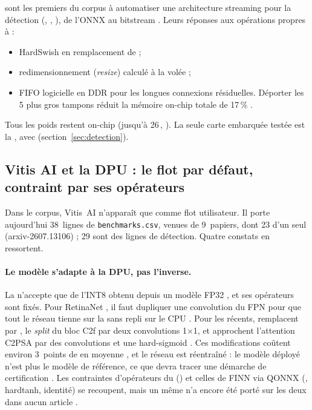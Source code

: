 \citet{2023-montgomerie-corcoran-satay-streaming-architecture-toolflow-accelerating} sont
les premiers du corpus à automatiser une architecture streaming pour la détection
(, , ), de l'ONNX au bitstream . Leurs réponses aux
opérations propres à  :
\begin{itemize}
  \item HardSwish en remplacement de   ;
  \item redimensionnement (\emph{resize}) calculé à la volée  ;
  \item FIFO logicielle en DDR pour les longues connexions résiduelles. Déporter les 5 plus
    gros tampons réduit la mémoire on-chip totale de 17\,\% .
\end{itemize}
Tous les poids restent on-chip (jusqu'à 26\,, ). La seule carte embarquée
testée est la , avec  (section~\ref{sec:detection}).

\subsection{Vitis AI et la DPU : le flot par défaut, contraint par ses opérateurs}

Dans le corpus, Vitis~AI n'apparaît que comme flot utilisateur. Il porte aujourd'hui
38~lignes de \texttt{benchmarks.csv}, venues de 9~papiers, dont 23 d'un seul
(arxiv-2607.13106) ; 29 sont des lignes de détection. Quatre constats en ressortent.

\paragraph{Le modèle s'adapte à la DPU, pas l'inverse.} La  n'accepte que de l'INT8
obtenu depuis un modèle FP32
\citep[§V-A]{arxiv-2509.04153-real-time-fpga-cnns-detection}\pp{}, et ses opérateurs
sont fixés. Pour RetinaNet , il faut dupliquer une convolution du FPN pour que tout
le réseau tienne sur la  sans repli sur le CPU
\citep[§2.3]{arxiv-2211.11647-benchmarking-edge-computing-devices-grape}. Pour les 
récents, \citet{arxiv-2607.13106-no-attention-no-problem-dpu}\pp{} remplacent  par ,
le \emph{split} du bloc C2f par deux convolutions 1$\times$1, et approchent l'attention
C2PSA par des convolutions et une hard-sigmoid . Ces modifications coûtent
environ 3~points de  en moyenne , et le réseau est réentraîné : le modèle
déployé n'est plus le modèle de référence, ce que devra tracer une démarche de
certification \deduit. Les contraintes d'opérateurs du 
() et celles de FINN via QONNX (, hardtanh, identité) se recoupent, mais un même
 n'a encore été porté sur les deux dans aucun article \deduit.

